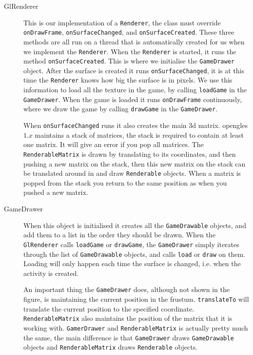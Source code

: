 \begin{description}

\item[GlRenderer] This is our implementation of a \lstinline|Renderer|, the class must override \lstinline|onDrawFrame|, \lstinline|onSurfaceChanged|, and \lstinline|onSurfaceCreated|. These three methods are all run on a thread that is automatically created for us when we implement the \lstinline|Renderer|. When the \lstinline|Renderer| is started, it runs the method \lstinline|onSurfaceCreated|. This is where we initialise the \lstinline|GameDrawer| object. After the surface is created it runs \lstinline|onSurfaceChanged|, it is at this time the \lstinline|Renderer| knows how big the surface is in pixels. We use this information to load all the texture in the game, by calling \lstinline|loadGame| in the \lstinline|GameDrawer|. When the game is loaded it runs \lstinline|onDrawFrame| continuously, where we draw the game by calling \lstinline|drawGame| in the \lstinline|GameDrawer|.

When \lstinline|onSurfaceChanged| runs it also creates the main \ac{3d} matrix. \ac{opengles} $1.x$ maintains a stack of matrices, the stack is required to contain at least one matrix. It will give an error if you pop all matrices. The \lstinline|RenderableMatrix| is drawn by translating to its coordinates, and then pushing a new matrix on the stack, then this new matrix on the stack can be translated around in and draw \lstinline|Renderable| objects. When a matrix is popped from the stack you return to the same position as when you pushed a new matrix. 

\item[GameDrawer] When this object is initialised it creates all the \lstinline|GameDrawable| objects, and add them to a list in the order they should be drawn. When the \lstinline|GlRenderer| calls \lstinline|loadGame| or \lstinline|drawGame|, the \lstinline|GameDrawer| simply iterates through the list of \lstinline|GameDrawable| objects, and calls \lstinline|load| or \lstinline|draw| on them. Loading will only happen each time the surface is changed, i.e. when the activity is created.

An important thing the \lstinline|GameDrawer| does, although not shown in the figure, is maintaining the current position in the frustum. \lstinline|translateTo| will translate the current position to the specified coordinate. \lstinline|RenderableMatrix| also maintains the position of the matrix that it is working with. \lstinline|GamerDrawer| and \lstinline|RenderableMatrix| is actually pretty much the same, the main difference is that \lstinline|GameDrawer| draws \lstinline|GameDrawable| objects and \lstinline|RenderableMatrix| draws \lstinline|Renderable| objects.


\end{description}
